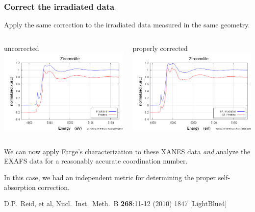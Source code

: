 \documentclass[10pt, xcolor=x11names, compress]{beamer}
\begin{document}
\begin{frame}
  \frametitle{Correct the irradiated data}
  Apply the same correction to the irradiated data measured in the same geometry.
  \begin{columns}
    \begin{column}{0.5\linewidth}
      \begin{center}
        uncorrected\\
        \includegraphics[width=0.8\linewidth]{images/pristine_irrad.png}
      \end{center}
    \end{column}
    \begin{column}{0.5\linewidth}
      \begin{center}
        properly corrected\\
        \includegraphics[width=0.8\linewidth]{images/zirconolite_fixed.png}
      \end{center}
    \end{column}
  \end{columns}

  \bigskip

  We can now apply Farge's characterization to these XANES data
  \textit{and} analyze the EXAFS data for a reasonably accurate
  coordination number.

  \medskip

  \begin{exampleblock}{}
    In this case, we had an independent metric for determining the
    proper self-absorption correction.
  \end{exampleblock}
  \begin{bottomnote}[0.5][19]
    D.P.~Reid, et al, Nucl.\ Inst.\ Meth.\ B \textbf{268}:11-12 (2010)
    1847
    [LightBlue4]
  \end{bottomnote}
\end{frame}
\end{document}
